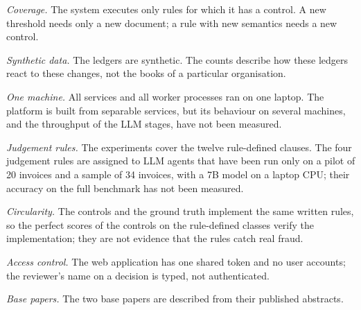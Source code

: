 \documentclass[conference]{IEEEtran}
\begin{document}
\textit{Coverage.} The system executes only rules for which it has a control. A new threshold needs only a new document; a rule with new semantics needs a new control.

\textit{Synthetic data.} The ledgers are synthetic. The counts describe how these ledgers react to these changes, not the books of a particular organisation.

\textit{One machine.} All services and all worker processes ran on one laptop. The platform is built from separable services, but its behaviour on several machines, and the throughput of the LLM stages, have not been measured.

\textit{Judgement rules.} The experiments cover the twelve rule-defined clauses. The four judgement rules are assigned to LLM agents that have been run only on a pilot of 20 invoices and a sample of 34 invoices, with a 7B model on a laptop CPU; their accuracy on the full benchmark has not been measured.

\textit{Circularity.} The controls and the ground truth implement the same written rules, so the perfect scores of the controls on the rule-defined classes verify the implementation; they are not evidence that the rules catch real fraud.

\textit{Access control.} The web application has one shared token and no user accounts; the reviewer's name on a decision is typed, not authenticated.

\textit{Base papers.} The two base papers are described from their published abstracts.

\end{document}
